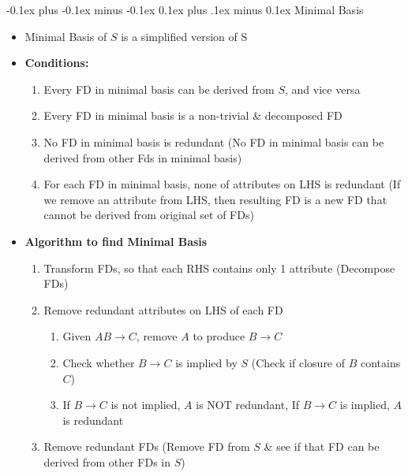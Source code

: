 \documentclass[landscape]{article}
\makeatletter
\renewcommand{\subsection}{\@startsection{subsection}{2}{0mm}%
  {-0.1ex plus -0.1ex minus -0.1ex}%
  {0.1ex plus .1ex minus 0.1ex}%
{\normalfont\scriptsize\bfseries}}
\makeatother
\begin{document}
\begin{multicols*}{5}
    \subsection{Minimal Basis}
    \begin{itemize}
      \item Minimal Basis of $S$ is a simplified version of S
      \item \textbf{Conditions:}
      \begin{enumerate}
        \item Every FD in minimal basis can be derived from $S$, and vice versa
        \item Every FD in minimal basis is a non-trivial \& decomposed FD
        \item No FD in minimal basis is redundant (No FD in minimal basis can be derived from other Fds in minimal basis)
        \item For each FD in minimal basis, none of attributes on LHS is redundant (If we remove an attribute from LHS, then resulting FD is a new FD that cannot be derived from original set of FDs)
      \end{enumerate}
      \item \textbf{Algorithm to find Minimal Basis}
      \begin{enumerate}
        \item Transform FDs, so that each RHS contains only 1 attribute (Decompose FDs)
        \item Remove redundant attributes on LHS of each FD
        \begin{enumerate}[label=\alph*]
          \item Given $AB \rightarrow C$, remove $A$ to produce $B \rightarrow C$
          \item Check whether $B \rightarrow C$ is implied by $S$ (Check if closure of $B$ contains $C$)
          \item If $B \rightarrow C$ is not implied, $A$ is NOT redundant, If $B \rightarrow C$ is implied, $A$ is redundant
        \end{enumerate}
        \item Remove redundant FDs (Remove FD from $S$ \& see if that FD can be derived from other FDs in $S$)
      \end{enumerate}
    \end{itemize}


\end{multicols*}
\end{document}
